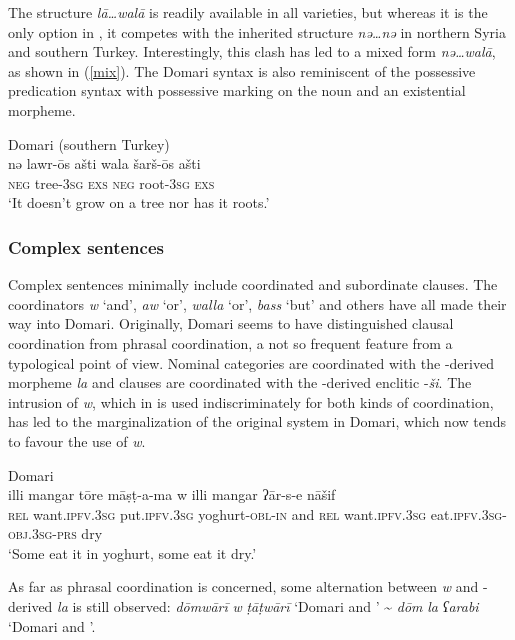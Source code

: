 \documentclass[output=paper]{langsci/langscibook}
\begin{document}
The  structure \textit{lā…walā} is readily available in all varieties, but whereas it is the only option in , it competes with the inherited structure \textit{nə…nə} in northern Syria and southern Turkey. Interestingly, this clash has led to a mixed form \textit{nə…walā}, as shown in (\ref{mix}). The Domari syntax is also reminiscent of the  possessive predication syntax with possessive marking on the noun and an {existential} morpheme.\pagebreak

\ea \label{mix}
{ Domari (southern Turkey)}\\
\gll nə lawr-ōs ašti wala šarš-ōs ašti\\
     \textsc{neg} tree\textsc{-3sg} \textsc{exs} \textsc{neg} {root}\textsc{-3sg} \textsc{exs}\\
\glt ‘It doesn’t grow on a tree nor has it {roots}.’
\z


 \subsubsection{Complex sentences}

Complex sentences minimally include coordinated and subordinate clauses. The  coordinators \textit{w} ‘and’, \textit{aw} ‘or’, \textit{walla} ‘or’, \textit{bass} `but' and others have all made their way into Domari. Originally, Domari seems to have distinguished clausal {coordination} from phrasal {coordination}, a not so frequent feature from a typological point of view. Nominal categories are coordinated with the -derived morpheme \textit{la} and clauses are coordinated with the -derived enclitic -\textit{ši}. The intrusion of  \textit{w}, which in  is used indiscriminately for both kinds of {coordination}, has led to the marginalization of the original system in  Domari, which now tends to favour the use of  \textit{w}.

\ea
{ Domari}\\
\gll illi mangar tōre māṣṭ-a-ma w illi mangar ʔār-s-e nāšif\\
     \textsc{rel} want.\textsc{ipfv.3sg} put.\textsc{ipfv.3sg} yoghurt-\textsc{obl-in} and \textsc{rel} want.\textsc{ipfv.3sg} eat.\textsc{ipfv.3sg-obj.3sg-prs} dry\\
\glt ‘Some eat it in yoghurt, some eat it dry.’
\z

As far as phrasal {coordination} is concerned, some alternation between  \textit{w} and -derived \textit{la} is still observed: \textit{dōmwārī} \textit{w} \textit{ṭāṭwārī} ‘Domari and ’ {\textasciitilde} \textit{dōm} \textit{la} \textit{ʕarabi} ‘Domari and ’.
\end{document}
